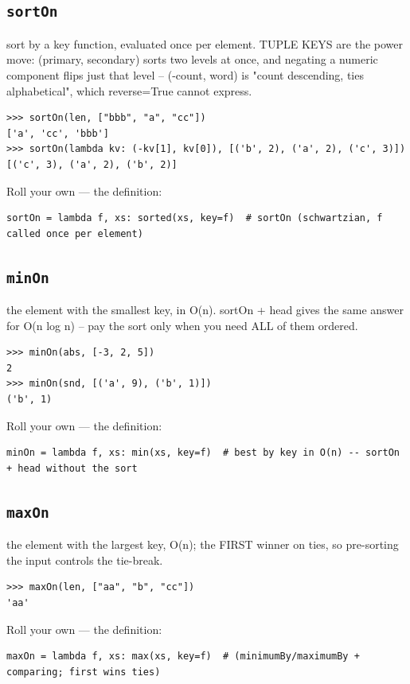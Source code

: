 \documentclass[10pt,letterpaper]{book}
\begin{document}
\subsection{\texttt{sortOn}}\label{def:sortOn}
sort by a key function, evaluated once per element. TUPLE KEYS are the power move: (primary, secondary) sorts two levels at once, and negating a numeric component flips just that level -- (-count, word) is "count descending, ties alphabetical", which reverse=True cannot express.
\begin{lstlisting}[style=ex]
>>> sortOn(len, ["bbb", "a", "cc"])
['a', 'cc', 'bbb']
>>> sortOn(lambda kv: (-kv[1], kv[0]), [('b', 2), ('a', 2), ('c', 3)])
[('c', 3), ('a', 2), ('b', 2)]
\end{lstlisting}

Roll your own --- the definition:

\begin{lstlisting}[style=ex]
sortOn = lambda f, xs: sorted(xs, key=f)  # sortOn (schwartzian, f called once per element)
\end{lstlisting}
\subsection{\texttt{minOn}}\label{def:minOn}
the element with the smallest key, in O(n). sortOn + head gives the same answer for O(n log n) -- pay the sort only when you need ALL of them ordered.
\begin{lstlisting}[style=ex]
>>> minOn(abs, [-3, 2, 5])
2
>>> minOn(snd, [('a', 9), ('b', 1)])
('b', 1)
\end{lstlisting}

Roll your own --- the definition:

\begin{lstlisting}[style=ex]
minOn = lambda f, xs: min(xs, key=f)  # best by key in O(n) -- sortOn + head without the sort
\end{lstlisting}
\subsection{\texttt{maxOn}}\label{def:maxOn}
the element with the largest key, O(n); the FIRST winner on ties, so pre-sorting the input controls the tie-break.
\begin{lstlisting}[style=ex]
>>> maxOn(len, ["aa", "b", "cc"])
'aa'
\end{lstlisting}

Roll your own --- the definition:

\begin{lstlisting}[style=ex]
maxOn = lambda f, xs: max(xs, key=f)  # (minimumBy/maximumBy + comparing; first wins ties)
\end{lstlisting}
\end{document}
